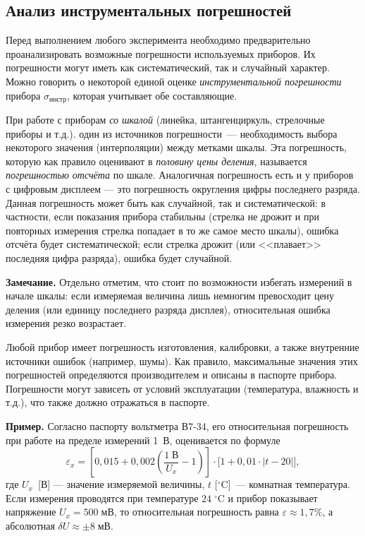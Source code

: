 \documentclass[10pt]{article}
\begin{document}
\subsection{Анализ инструментальных погрешностей}

Перед выполнением любого эксперимента необходимо предварительно проанализировать
возможные погрешности используемых приборов. Их погрешности могут
иметь как систематический, так и случайный характер. Можно говорить
о некоторой единой оценке \emph{инструментальной погрешности} прибора
$\sigma_{\text{инстр}}$, которая учитывает обе составляющие.

При работе с приборам \emph{со шкалой} (линейка, штангенциркуль, стрелочные
приборы и т.д.). один из источников погрешности~--- необходимость
выбора некоторого значения (интерполяции) между метками шкалы. Эта
погрешность, которую как правило оценивают в \emph{половину цены деления},
называется\emph{ погрешностью отсчёта} по шкале. Аналогичная погрешность
есть и у приборов с цифровым дисплеем --- это погрешность
округления цифры последнего разряда. Данная погрешность может быть
как случайной, так и систематической: в частности, если показания
прибора стабильны (стрелка не дрожит и при повторных измерения стрелка
попадает в то же самое место шкалы), ошибка отсчёта будет систематической;
если стрелка дрожит (или <<плавает>> последняя
цифра разряда), ошибка будет случайной. 

\textbf{\small{}Замечание.}{\small{} Отдельно отметим, что стоит по
возможности избегать измерений в начале шкалы: если измеряемая величина
лишь немногим превосходит цену деления (или единицу последнего разряда
дисплея), относительная ошибка измерения резко возрастает.}{\small\par}

Любой прибор имеет погрешность изготовления, калибровки, а также внутренние
источники ошибок (например, шумы). Как правило, максимальные значения
этих погрешностей определяются производителем и описаны в паспорте
прибора. Погрешности могут зависеть от условий эксплуатации (температура,
влажность и т.д.), что также должно отражаться в паспорте. 

\textbf{\footnotesize{}Пример.}{\footnotesize{} Согласно паспорту
вольтметра В7-34, его относительная погрешность при работе на пределе
измерений 1~В, оценивается по формуле 
\[
\varepsilon_{x}=\left[0{,}015+0{,}002\left(\frac{1\;\text{В}}{U_{x}}-1\right)\right]\cdot\bigr[1+0{,}01\cdot|t-20|\bigl],
\]
где $U_{x}$~{[}В{]} --- значение измеряемой величины,
$t$ {[}$^{\circ}\mathrm{C}${]}~--- комнатная температура.
Если измерения проводятся при температуре $24\;^{\circ}\mathrm{C}$
и прибор показывает напряжение $U_{x}=500\;\text{мВ}$, то относительная
погрешность равна $\varepsilon\approx1{,}7\%$, а абсолютная $\delta U\approx\pm8\;\text{мВ}.$}{\footnotesize\par}
\end{document}
